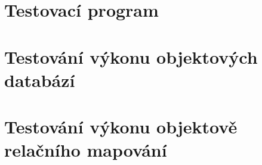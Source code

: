 \section{Testovací program}


\section{Testování výkonu objektových databází}


\section{Testování výkonu objektově relačního mapování }

